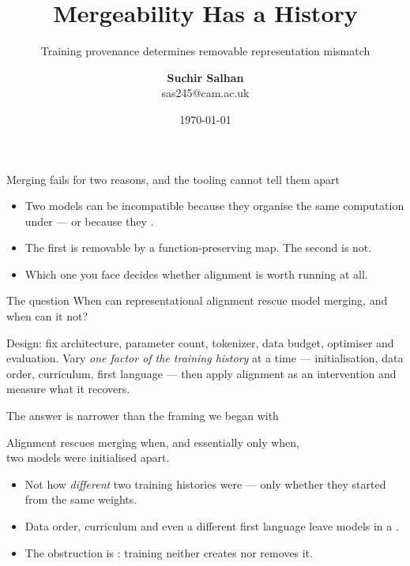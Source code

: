 \documentclass{beamer}
\title{{\bf Mergeability Has a History}}
\subtitle{Training provenance determines removable representation mismatch}
\author{\textbf{Suchir Salhan} \\ sas245@cam.ac.uk}
\institute[CL]{Computer Laboratory, University of Cambridge, UK}
\date{\today}
\begin{document}
\begin{frame}
  \titlepage
\end{frame}

\begin{frame}{Merging fails for two reasons, and the tooling cannot tell them apart}
  \begin{itemize}
    \item Two models can be incompatible because they organise the same computation under
           --- or because they .
    \item The first is removable by a function-preserving map. The second is not.
    \item Which one you face decides whether alignment is worth running at all.
  \end{itemize}
  \vfill
  \begin{block}{The question}
    When can representational alignment rescue model merging, and when can it not?
  \end{block}
  \vfill
  {\footnotesize Design: fix architecture, parameter count, tokenizer, data budget, optimiser and
  evaluation. Vary \emph{one factor of the training history} at a time --- initialisation, data
  order, curriculum, first language --- then apply alignment as an \alert{intervention} and measure
  what it recovers.}
\end{frame}

\begin{frame}{The answer is narrower than the framing we began with}
  \vfill
  \begin{block}{}
    \centering\large
    Alignment rescues merging when, and essentially only when,\\
    two models were \alert{initialised apart}.
  \end{block}
  \vfill
  \begin{itemize}
    \item Not how \emph{different} two training histories were --- only whether they started from
          the same weights.
    \item Data order, curriculum and even a different first language leave models in a
          .
    \item The obstruction is : training neither creates nor removes it.
  \end{itemize}
  \vfill
\end{frame}
\end{document}
